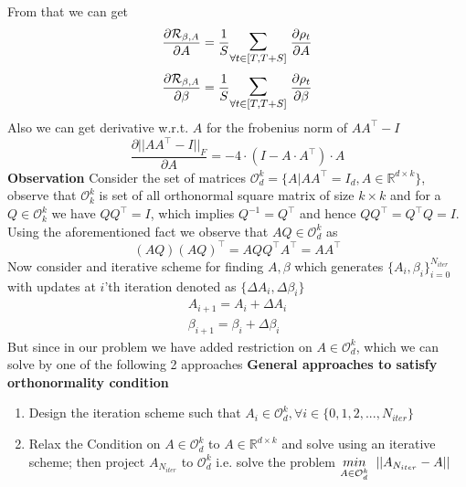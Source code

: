 \newline From that we can get
\begin{equation}
    \frac{\partial \mathcal{R}_{\beta, A}}{\partial A} = \frac{1}{S} \mathlarger{\mathlarger{\sum}}_{\forall t\in [T,T+S]} \hspace{1mm} \frac{\partial \rho_t}{\partial A} 
\end{equation}
\begin{equation}
    \frac{\partial \mathcal{R}_{\beta, A}}{\partial \beta} = \frac{1}{S} \mathlarger{\mathlarger{\sum}}_{\forall t\in [T,T+S]} \hspace{1mm} \frac{\partial \rho_t}{\partial \beta} 
\end{equation}
\newline Also we can get derivative w.r.t. $A$ for the frobenius norm of $AA^\top-I$
\begin{equation} \label{eq:derivative_forb_norm_ofAAtmI}
    \frac{\partial ||AA^\top-I||_F}{\partial A} = -4\cdot (I-A\cdot A^\top )\cdot A
\end{equation}
\textbf{Observation}\newline 
Consider the set of matrices $\mathcal{O}_d^k = \{ A | AA^\top = I_d, A \in \mathbb{R}^{d\times k} \}$, observe that $\mathcal{O}_k^k$ is set of all orthonormal square matrix of size $k\times k$ and for a $Q\in \mathcal{O}_k^k$ we have $QQ^\top = I$, which implies $Q^{-1}= Q^\top$ and hence $QQ^\top = Q^\top Q = I$. Using the aforementioned fact we observe that $AQ\in \mathcal{O}_d^k$ as
\begin{equation} \label{observation:ortho-closure_odk}
    (AQ)(AQ)^\top = AQQ^\top A^\top = AA^\top 
\end{equation}
Now consider and iterative scheme for finding $A, \beta$ which generates $\{A_i, \beta_i\}_{i=0}^{N_{iter}}$ with updates at $i$'th iteration denoted as $\{\Delta A_i, \Delta \beta_i\}$
\begin{equation}
\begin{aligned}
    A_{i+1} = A_i + \Delta A_i \\
    \beta_{i+1} = \beta_i + \Delta \beta_i
\end{aligned}
\end{equation}
But since in our problem we have added restriction on $A \in \mathcal{O}_d^k$, which we can solve by one of the following 2 approaches 
\newline \newline \textbf{General approaches to satisfy orthonormality condition}
\begin{enumerate}
    \item Design the iteration scheme such that $A_i \in \mathcal{O}_d^k, \forall i \in \{0,1,2,...,N_{iter}\}$
    \item Relax the Condition on $A \in \mathcal{O}_d^k$ to $A \in \mathbb{R}^{d\times k}$ and solve using an iterative scheme;  then project $A_{N_{iter}}$ to $\mathcal{O}_d^k$ i.e. solve the problem $\underset{A \in \mathcal{O}_d^k}{min} \hspace{2mm} ||A_{N_{iter}}-A||$
\end{enumerate}
